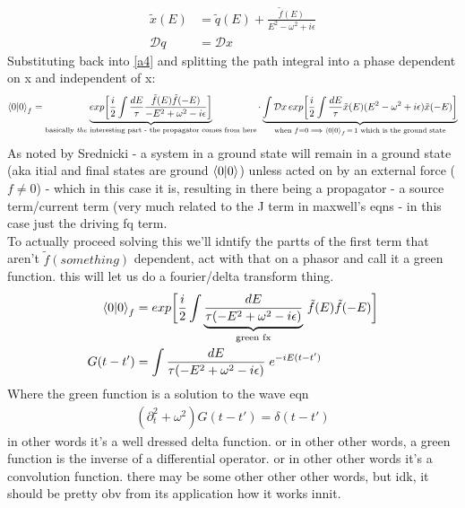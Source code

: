 \documentclass{article}
\begin{document}
\begin{align}
	\tilde{x}(E) &= \tilde{q}(E) + \frac{ \tilde{f}(E) }{E^2 - \omega^2 + i\epsilon } \\
	\mathcal{D}q &= \mathcal{D}x
\end{align}
Substituting back into \ref{a4} and splitting the path integral into a phase dependent on x and independent of x:
\begin{align}
	\braket{0}{0}_f = \underbrace{ exp \bigg[ \frac{i}{2} \int \frac{dE}{\tau} \frac{ \tilde{f}(E) \tilde{f}(-E) }{-E^2+\omega^2-i\epsilon} \bigg] }_{\text{basically \textit{the} interesting part - the propagator comes from here}} \cdot \underbrace{ \int \mathcal{D}x\, exp \bigg[ \frac{i}{2} \int \frac{dE}{\tau} \tilde{x}(E) (E^2 - \omega^2 +i\epsilon) \tilde{x}(-E) \bigg] }_{\text{when } f=0 \implies \braket{0}{0}_f	\, = \, 1 \text{ which is the ground state}} \\
\end{align}
As noted by Srednicki - a system in a ground state will remain in a ground state (aka itial and final states are ground $\braket{0}{0}$) unless acted on by an external force ($f \neq 0$) - which in this case it is, resulting in there being a propagator - a source term/current term (very much related to the J term in maxwell's eqns - in this case just the driving fq term. \\
To actually proceed solving this we'll idntify the partts of the first term that aren't $\tilde{f}(something)$ dependent, act with that on a phasor and call it a green function. this will let us do a fourier/delta transform thing.
\begin{align}
	\braket{0}{0}_f &= exp \bigg[ \frac{i}{2} \int \underbrace{ \frac{dE}{\tau(-E^2+\omega^2-i\epsilon)}}_{\text{green fx}} \, \tilde{f}(E) \tilde{f}(-E) \bigg] \\
	G(t-t') &= \int \frac{dE}{\tau(-E^2+\omega^2-i\epsilon)} \; e^{-iE(t-t')} \label{b1}
\end{align}
Where the green function is a solution to the wave eqn
\begin{align}
	(\partial_{t}^2 + \omega^2)G(t-t') = \delta(t-t') \label{b2}
\end{align}
in other words it's a well dressed delta function. or in other other words, a green function is the inverse of a differential operator. or in other other words it's a convolution function. there may be some other other other words, but idk, it should be pretty obv from its application how it works innit. \\
\end{document}
